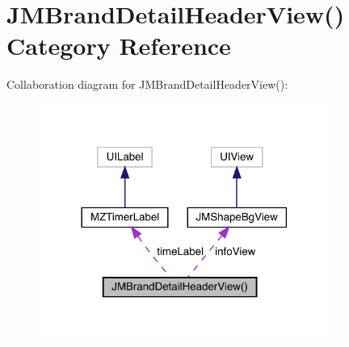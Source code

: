 \hypertarget{category_j_m_brand_detail_header_view_07_08}{}\section{J\+M\+Brand\+Detail\+Header\+View() Category Reference}
\label{category_j_m_brand_detail_header_view_07_08}


Collaboration diagram for J\+M\+Brand\+Detail\+Header\+View()\+:\nopagebreak
\begin{figure}[H]
\begin{center}
\leavevmode
\includegraphics[width=270pt]{category_j_m_brand_detail_header_view_07_08__coll__graph}
\end{center}
\end{figure}
